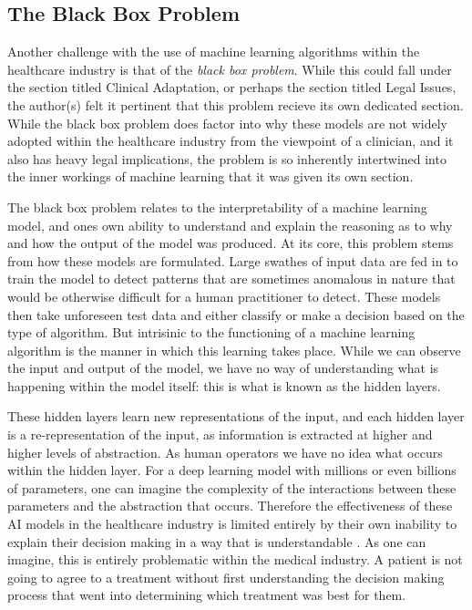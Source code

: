 \documentclass[12pt]{article}
\begin{document}
\subsection{The Black Box Problem}

Another challenge with the use of machine learning algorithms within the healthcare industry is that of the \textit{black box problem}. While this could fall under the section titled Clinical Adaptation, or perhaps the section titled Legal Issues, the author(s) felt it pertinent that this problem recieve its own dedicated section. While the black box problem does factor into why these models are not widely adopted within the healthcare industry from the viewpoint of a clinician, and it also has heavy legal implications, the problem is so inherently intertwined into the inner workings of machine learning that it was given its own section. \

The black box problem relates to the interpretability of a machine learning model, and ones own ability to understand and explain the reasoning as to why and how the output of the model was produced. At its core, this problem stems from how these models are formulated. Large swathes of input data are fed in to train the model to detect patterns that are sometimes anomalous in nature that would be otherwise difficult for a human practitioner to detect. These models then take unforeseen test data and either classify or make a decision based on the type of algorithm. But intrisinic to the functioning of a machine learning algorithm is the manner in which this learning takes place. While we can observe the input and output of the model, we have no way of understanding what is happening within the model itself: this is what is known as the hidden layers. \

These hidden layers learn new representations of the input, and each hidden layer is a re-representation of the input, as information is extracted at higher and higher levels of abstraction. As human operators we have no idea what occurs within the hidden layer. For a deep learning model with millions or even billions of parameters, one can imagine the complexity of the interactions between these parameters and the abstraction that occurs. Therefore the effectiveness of these AI models in the healthcare industry is limited entirely by their own inability to explain their decision making in a way that is understandable \citep{Kelly_2019, Guan_2019}. As one can imagine, this is entirely problematic within the medical industry. A patient is not going to agree to a treatment without first understanding the decision making process that went into determining which treatment was best for them. \
\end{document}
